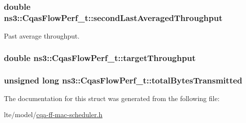 \subsubsection[{\texorpdfstring{second\+Last\+Averaged\+Throughput}{secondLastAveragedThroughput}}]{\setlength{\rightskip}{0pt plus 5cm}double ns3\+::\+Cqas\+Flow\+Perf\+\_\+t\+::second\+Last\+Averaged\+Throughput}\hypertarget{structns3_1_1CqasFlowPerf__t_a56f64fb7011f9b6d395803a9a70a0276}{}\label{structns3_1_1CqasFlowPerf__t_a56f64fb7011f9b6d395803a9a70a0276}


Past average throughput. 

\subsubsection[{\texorpdfstring{target\+Throughput}{targetThroughput}}]{\setlength{\rightskip}{0pt plus 5cm}double ns3\+::\+Cqas\+Flow\+Perf\+\_\+t\+::target\+Throughput}\hypertarget{structns3_1_1CqasFlowPerf__t_a59a4f50ec37c798c1163f07d23a8a84a}{}\label{structns3_1_1CqasFlowPerf__t_a59a4f50ec37c798c1163f07d23a8a84a}
\subsubsection[{\texorpdfstring{total\+Bytes\+Transmitted}{totalBytesTransmitted}}]{\setlength{\rightskip}{0pt plus 5cm}unsigned {\bf long} ns3\+::\+Cqas\+Flow\+Perf\+\_\+t\+::total\+Bytes\+Transmitted}\hypertarget{structns3_1_1CqasFlowPerf__t_abdf619f3bb7ee6637e10ebc63add398b}{}\label{structns3_1_1CqasFlowPerf__t_abdf619f3bb7ee6637e10ebc63add398b}


The documentation for this struct was generated from the following file\+:\begin{DoxyCompactItemize}
\item 
lte/model/\hyperlink{cqa-ff-mac-scheduler_8h}{cqa-\/ff-\/mac-\/scheduler.\+h}\end{DoxyCompactItemize}
